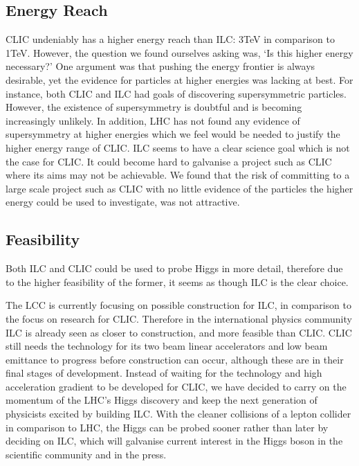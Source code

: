 \subsection{Energy Reach}

CLIC undeniably has a higher energy reach than ILC: 3TeV in comparison to 1TeV. However, the question we found ourselves asking was, ‘Is this higher energy necessary?’  One argument was that pushing the energy frontier is always desirable, yet the evidence for particles at higher energies was lacking at best. For instance, both CLIC and ILC had goals of discovering supersymmetric particles. However, the existence of supersymmetry is doubtful and is becoming increasingly unlikely. In addition, LHC has not found any evidence of supersymmetry at higher energies which we feel would be needed to justify the higher energy range of CLIC. ILC seems to have a clear science goal which is not the case for CLIC. It could become hard to galvanise a project such as CLIC where its aims may not be achievable. We found that the risk of committing to a large scale project such as CLIC with no little evidence of the particles the higher energy could be used to investigate, was not attractive.

\subsection{Feasibility}

Both ILC and CLIC could be used to probe Higgs in more detail, therefore due to the higher feasibility of the former, it seems as though ILC is the clear choice.

The LCC is currently focusing on possible construction for ILC, in comparison to the focus on research for CLIC. Therefore in the international physics community ILC is already seen as closer to construction, and more feasible than CLIC. CLIC still needs the technology for its two beam linear accelerators and low beam emittance to progress before construction can occur, although these are in their final stages of development. Instead of waiting for the technology and high acceleration gradient to be developed for CLIC, we have decided to carry on the momentum of the LHC’s Higgs discovery and keep the next generation of physicists excited by building ILC. With the cleaner collisions of a lepton collider in comparison to LHC, the Higgs can be probed sooner rather than later by deciding on ILC, which will galvanise current interest in the Higgs boson in the scientific community and in the press.